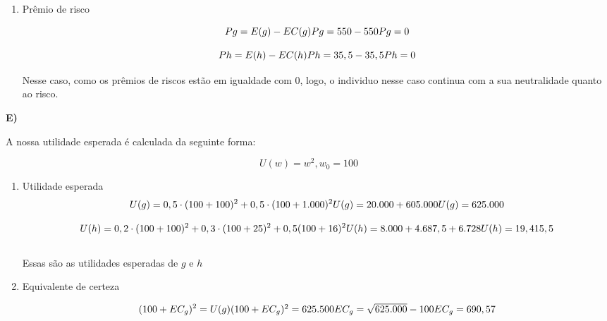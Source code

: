 \begin{flushleft}
\begin{enumerate}
	\item Prêmio de risco
	
	\begin{equation}
	Pg = E(g) - EC(g)
	$$\\$$
	Pg = 550 - 550
	$$\\$$
	Pg = 0
	\end{equation}
	
	\begin{equation}
	Ph = E(h) - EC(h)
	$$\\$$
	Ph = 35,5 - 35,5
	$$\\$$
	Ph = 0
	\end{equation}
	
	Nesse caso, como os prêmios de riscos estão em igualdade com 0, logo, o individuo nesse caso continua com a sua neutralidade quanto ao risco.
\end{enumerate}

\textbf{E)}

A nossa utilidade esperada é calculada da seguinte forma:

\begin{equation}
U(w) = w^{2} ,   w_{0} = 100
\end{equation}

\begin{enumerate}
	\item Utilidade esperada
	\begin{equation}
	U(g) = 0,5 \cdot (100 + 100)^{2} + 0,5 \cdot(100 + 1.000)^{2}
	$$\\$$
	U(g) = 20.000 + 605.000
	$$\\$$
	U(g) = 625.000
	\end{equation}
	
	\begin{equation}
	U(h) = 0,2 \cdot (100 + 100)^{2} + 0,3 \cdot(100 + 25)^{2} + 0,5(100 + 16)^{2}
	$$\\$$
	U(h) = 8.000 + 4.687,5 + 6.728
	$$\\$$
	U(h) = 19,415,5
	\end{equation}
	\\ Essas são as utilidades esperadas de $g$ e $h$
	
	\item Equivalente de certeza
	
	\begin{equation}
	(100 + EC_{g})^{2} = U(g)
	$$\\$$
	(100 + EC_{g})^{2} = 625.500
	$$\\$$
	EC_{g} = \sqrt{625.000} - 100
	$$\\$$
	EC_{g} = 690,57
	\end{equation}
	

\end{enumerate}
\end{flushleft}
